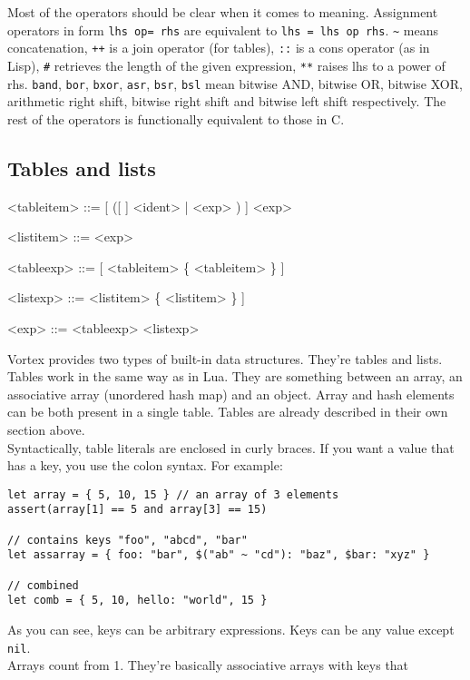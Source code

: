 \documentclass{article}
\newenvironment{bnf}
{
\begin{mdframed}
\begin{grammar}
}
{
\end{grammar}
\end{mdframed}
}
\begin{document}
Most of the operators should be clear when it comes to meaning. Assignment
operators in form \verb|lhs op= rhs| are equivalent to \verb|lhs = lhs op rhs|.
\verb|~| means concatenation, \verb|++| is a join operator (for tables),
\verb|::| is a cons operator (as in Lisp), \verb|#| retrieves the length
of the given expression, \verb|**| raises lhs to a power of rhs. \verb|band|,
\verb|bor|, \verb|bxor|, \verb|asr|, \verb|bsr|, \verb|bsl| mean bitwise AND,
bitwise OR, bitwise XOR, arithmetic right shift, bitwise right shift and
bitwise left shift respectively. The rest of the operators is functionally
equivalent to those in C.
\subsection{Tables and lists}
\begin{bnf}
<tableitem> ::= [ ([ \lit{\$} ] <ident> | \lit{\$(} <exp> \lit{)})
    \lit{:} ] <exp>

<listitem> ::= <exp>

<tableexp> ::= \lit{\{} [ <tableitem> \{ \lit{,} <tableitem> \} ] \lit{\}}

<listexp> ::= \lit{[} <listitem> \{ \lit{,} <listitem> \} ] \lit{]}

<exp> ::= <tableexp>
    \alt <listexp>
\end{bnf}
Vortex provides two types of built-in data structures. They're tables and
lists.\\
Tables work in the same way as in Lua. They are something between an array,
an associative array (unordered hash map) and an object. Array and hash
elements can be both present in a single table. Tables are already described
in their own section above.\\
Syntactically, table literals are enclosed in curly braces. If you want a
value that has a key, you use the colon syntax. For example:
\begin{lstlisting}[language=vortex]
let array = { 5, 10, 15 } // an array of 3 elements
assert(array[1] == 5 and array[3] == 15)

// contains keys "foo", "abcd", "bar"
let assarray = { foo: "bar", $("ab" ~ "cd"): "baz", $bar: "xyz" }

// combined
let comb = { 5, 10, hello: "world", 15 } 
\end{lstlisting}
As you can see, keys can be arbitrary expressions. Keys can be any value
except \verb|nil|.\\
Arrays count from 1. They're basically associative arrays with keys that
\end{document}
